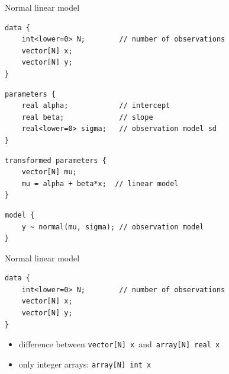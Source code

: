 \documentclass[finnish,english,t]{beamer}
\begin{document}
\begin{frame}[fragile]{Normal linear model}
  
  {\small
    {
  \begin{verbatim}
data {
    int<lower=0> N;        // number of observations
    vector[N] x; 
    vector[N] y;  
}
\end{verbatim}
    }
    \vspace{-1.5\baselineskip}
    {
\begin{verbatim}
parameters {
    real alpha;            // intercept
    real beta;             // slope
    real<lower=0> sigma;   // observation model sd
}
\end{verbatim}
    }
    \vspace{-1.5\baselineskip}
    {
\begin{verbatim}
transformed parameters {
    vector[N] mu;
    mu = alpha + beta*x;  // linear model
}
\end{verbatim}
    }
    \vspace{-1.5\baselineskip}
    {
\begin{verbatim}
model {
    y ~ normal(mu, sigma); // observation model
}
\end{verbatim}
    }
  }
  
\end{frame} 

\begin{frame}[fragile]{Normal linear model}
  
  {\small
  \begin{verbatim}
data {
    int<lower=0> N;        // number of observations
    vector[N] x; 
    vector[N] y;  
}
\end{verbatim}
  }

  \begin{itemize}
  \item difference between {\small\tt vector[N] x}\, and\, {\small\tt array[N] real x}
  \item<2-> only integer arrays: {\small\tt array[N] int x}
  \end{itemize}
  
\end{frame}
\end{document}
